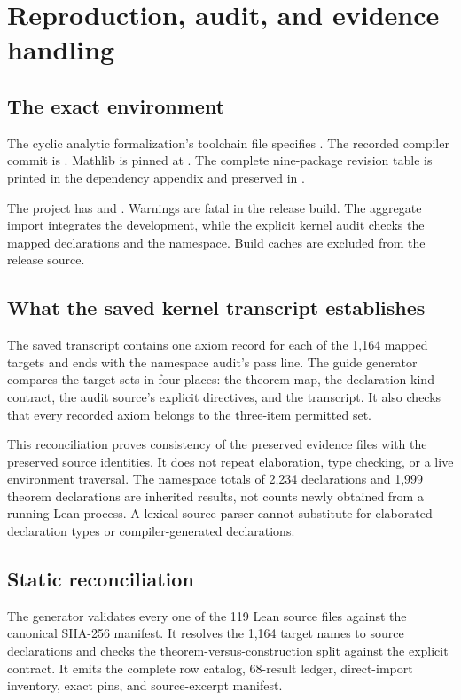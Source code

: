 \section{Reproduction, audit, and evidence handling}
\subsection{The exact environment}
The cyclic analytic formalization's toolchain file specifies . The recorded compiler commit is . Mathlib is pinned at . The complete nine-package revision table is printed in the dependency appendix and preserved in .

The project has  and . Warnings are fatal in the release build. The aggregate import integrates the development, while the explicit kernel audit checks the mapped declarations and the namespace. Build caches are excluded from the release source.

\subsection{What the saved kernel transcript establishes}
The saved transcript contains one axiom record for each of the 1,164 mapped targets and ends with the namespace audit's pass line. The guide generator compares the target sets in four places: the theorem map, the declaration-kind contract, the audit source's explicit directives, and the transcript. It also checks that every recorded axiom belongs to the three-item permitted set.

This reconciliation proves consistency of the preserved evidence files with the preserved source identities. It does not repeat elaboration, type checking, or a live environment traversal. The namespace totals of 2,234 declarations and 1,999 theorem declarations are inherited results, not counts newly obtained from a running Lean process. A lexical source parser cannot substitute for elaborated declaration types or compiler-generated declarations.

\subsection{Static reconciliation}
The generator validates every one of the 119 Lean source files against the canonical SHA-256 manifest. It resolves the 1,164 target names to source declarations and checks the theorem-versus-construction split against the explicit contract. It emits the complete row catalog, 68-result ledger, direct-import inventory, exact pins, and source-excerpt manifest.

